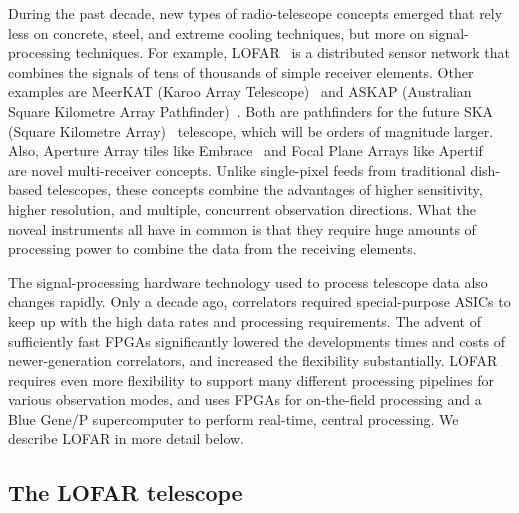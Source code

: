 \documentclass{article}
\begin{document}
During the past decade, new types of radio-telescope concepts emerged that
rely less on concrete, steel, and extreme cooling techniques, but more on
signal-processing techniques.
For example, LOFAR~\cite{Butcher:04} is a distributed sensor network
that combines the signals of tens of thousands of simple receiver elements.
Other examples are MeerKAT (Karoo Array Telescope)~\cite{meerkat} and
ASKAP (Australian Square Kilometre Array Pathfinder)~\cite{askap}. Both are
pathfinders for the future SKA (Square Kilometre Array)~\cite{ska} telescope, which
will be orders of magnitude larger.
Also, Aperture Array tiles like Embrace~\cite{embrace} and Focal Plane Arrays
like Apertif~\cite{apertif} are novel multi-receiver concepts.
Unlike single-pixel feeds from traditional dish-based telescopes, these
concepts combine the advantages of higher sensitivity, higher resolution,
and multiple, concurrent observation directions.
What the noveal instruments all have in common is that they require huge
amounts of processing power to combine the data from the receiving elements.

The signal-processing hardware technology used to process telescope
data also changes rapidly.  Only a decade ago, correlators required
special-purpose ASICs to keep up with the high data rates and
processing requirements.  The advent of sufficiently fast FPGAs
significantly lowered the developments times and costs of
newer-generation correlators, and increased the flexibility
substantially. LOFAR requires even more flexibility to support many
different processing pipelines for various observation modes, and uses
FPGAs for on-the-field processing and a Blue Gene/P
supercomputer to perform real-time, central processing.
We describe LOFAR in more detail below.



\subsection{The LOFAR telescope}
\end{document}
